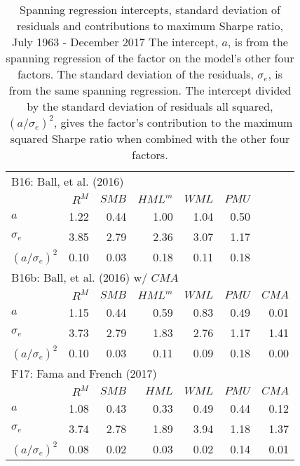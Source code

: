 
\begin{table}[!ht]
\centering
\caption{
\scriptsize{
Spanning regression intercepts, standard deviation of residuals and contributions to
maximum Sharpe ratio, July 1963 - December 2017 The intercept, $a$, is from the spanning
regression of the factor on the model’s other four factors. The standard deviation of the
residuals, $\sigma_e$, is from the same spanning regression. The intercept divided by the
standard deviation of residuals all squared, $\left( a/\sigma_e\right) ^2$, gives the
factor's contribution to the maximum squared Sharpe ratio when combined with the other
four factors.
}
}
\begin{tabular}{lrrrrrr}
  \toprule
  \multicolumn{7}{l}{B16: Ball, et al. (2016)}  \\
                                &  $R^M$ &  $SMB$ &$HML^m$ &  $WML$ &  $PMU$ &   \\
  $a$                           &  1.22  &  0.44  &  1.00  &  1.04  &  0.50  &   \\
  $\sigma_e$                    &  3.85  &  2.79  &  2.36  &  3.07  &  1.17  &   \\
  $\left( a/\sigma_e\right) ^2$ &  0.10  &  0.03  &  0.18  &  0.11  &  0.18  &   \\
[1em]
  \multicolumn{7}{l}{B16b: Ball, et al. (2016) w/ $CMA$}  \\
                                &  $R^M$ &  $SMB$ &$HML^m$ &  $WML$ &  $PMU$ &  $CMA$ \\
  $a$                           &  1.15  &  0.44  &  0.59  &  0.83  &  0.49  &  0.01  \\
  $\sigma_e$                    &  3.73  &  2.79  &  1.83  &  2.76  &  1.17  &  1.41  \\
  $\left( a/\sigma_e\right) ^2$ &  0.10  &  0.03  &  0.11  &  0.09  &  0.18  &  0.00  \\
[1em]
  \multicolumn{7}{l}{F17: Fama and French (2017)}  \\
                                &  $R^M$ &  $SMB$ &  $HML$ &  $WML$ &  $PMU$ &  $CMA$ \\
  $a$                           &  1.08  &  0.43  &  0.33  &  0.49  &  0.44  &  0.12  \\
  $\sigma_e$                    &  3.74  &  2.78  &  1.89  &  3.94  &  1.18  &  1.37  \\
  $\left( a/\sigma_e\right) ^2$ &  0.08  &  0.02  &  0.03  &  0.02  &  0.14  &  0.01  \\
  \bottomrule
\end{tabular}
\label{tbl:contributions}
\end{table}
